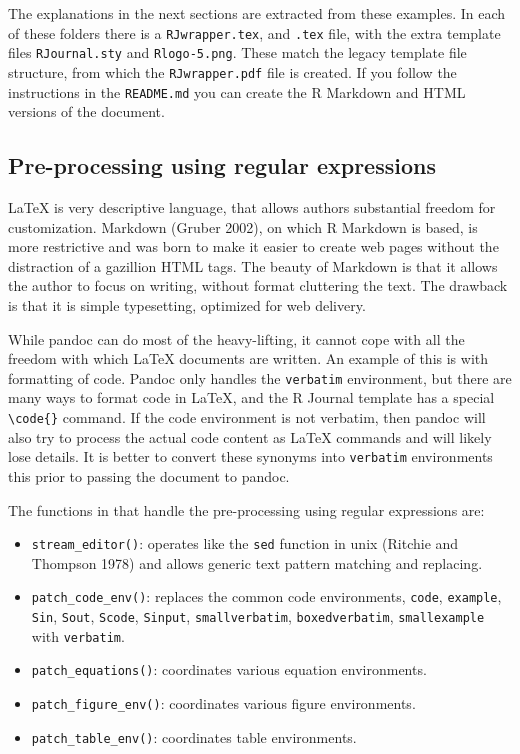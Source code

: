 The explanations in the next sections are extracted from these examples. In each of these folders there is a \texttt{RJwrapper.tex}, and \texttt{.tex} file, with the extra template files \texttt{RJournal.sty} and \texttt{Rlogo-5.png}. These match the legacy template file structure, from which the \texttt{RJwrapper.pdf} file is created. If you follow the instructions in the \texttt{README.md} you can create the R Markdown and HTML versions of the document.

\hypertarget{pre-processing-using-regular-expressions}{%
\subsection{Pre-processing using regular expressions}\label{pre-processing-using-regular-expressions}}

LaTeX is very descriptive language, that allows authors substantial freedom for customization. Markdown (Gruber 2002), on which R Markdown is based, is more restrictive and was born to make it easier to create web pages without the distraction of a gazillion HTML tags. The beauty of Markdown is that it allows the author to focus on writing, without format cluttering the text. The drawback is that it is simple typesetting, optimized for web delivery.

While pandoc can do most of the heavy-lifting, it cannot cope with all the freedom with which LaTeX documents are written. An example of this is with formatting of code. Pandoc only handles the \texttt{verbatim} environment, but there are many ways to format code in LaTeX, and the R Journal template has a special \texttt{\textbackslash{}code\{\}} command. If the code environment is not verbatim, then pandoc will also try to process the actual code content as LaTeX commands and will likely lose details. It is better to convert these synonyms into \texttt{verbatim} environments this prior to passing the document to pandoc.

The functions in  that handle the pre-processing using regular expressions are:

\begin{itemize}
\tightlist
\item
  \texttt{stream\_editor()}: operates like the \texttt{sed} function in unix (Ritchie and Thompson 1978) and allows generic text pattern matching and replacing.
\item
  \texttt{patch\_code\_env()}: replaces the common code environments, \texttt{code}, \texttt{example}, \texttt{Sin}, \texttt{Sout}, \texttt{Scode}, \texttt{Sinput}, \texttt{smallverbatim}, \texttt{boxedverbatim}, \texttt{smallexample} with \texttt{verbatim}.
\item
  \texttt{patch\_equations()}: coordinates various equation environments.
\item
  \texttt{patch\_figure\_env()}: coordinates various figure environments.
\item
  \texttt{patch\_table\_env()}: coordinates table environments.
\end{itemize}

